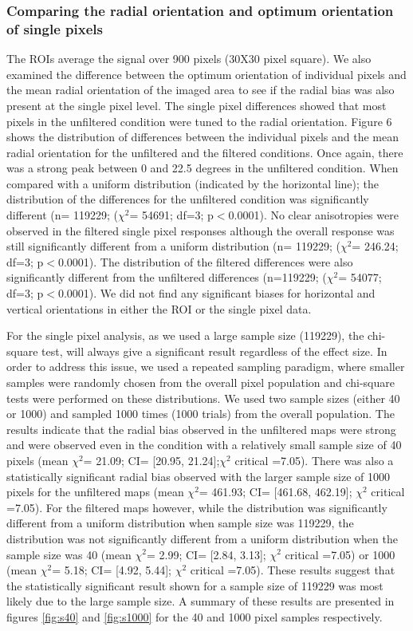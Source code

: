 		\subsubsection{Comparing the radial orientation and optimum orientation of single pixels}
		The ROIs average the signal over 900 pixels (30X30 pixel square). We also examined the difference between the optimum orientation of individual pixels and the mean radial orientation of the imaged area to see if the radial bias was also present at the single pixel level. The single pixel differences showed that most pixels in the unfiltered condition were tuned to the radial orientation. Figure 6 shows the distribution of differences between the individual pixels and the mean radial orientation for the unfiltered and the filtered conditions. Once again, there was a strong peak between 0 and 22.5 degrees in the unfiltered condition. When compared with a uniform distribution (indicated by the horizontal line); the distribution of the differences for the unfiltered condition was significantly different (n= 119229; ($\chi^2$= 54691; df=3; p$<$0.0001). No clear anisotropies were observed in the filtered single pixel responses although the overall response was still significantly different from a uniform distribution (n= 119229; ($\chi^2$= 246.24; df=3; p$<$0.0001). The distribution of the filtered differences were also significantly different from the unfiltered differences (n=119229; ($\chi^2$= 54077; df=3; p$<$0.0001). We did not find any significant biases for horizontal and vertical orientations in either the ROI or the single pixel data.	
			
		For the single pixel analysis, as we used a large sample size (119229), the chi-square test, will always give a significant result regardless of the effect size. In order to address this issue, we used a repeated sampling paradigm, where smaller samples were randomly chosen from the overall pixel population and chi-square tests were performed on these distributions. We used two sample sizes (either 40 or 1000) and sampled 1000 times (1000 trials) from the overall population. The results indicate that the radial bias observed in the unfiltered maps were strong and were observed even in the condition with a relatively small sample size of 40 pixels (mean $\chi^2$= 21.09; CI= [20.95, 21.24];$\chi^2$ critical =7.05). There was also a statistically significant radial bias observed with the larger sample size of 1000 pixels for the unfiltered maps (mean $\chi^2$= 461.93; CI= [461.68, 462.19]; $\chi^2$ critical =7.05). For the filtered maps however, while the distribution was significantly different from a uniform distribution when sample size was 119229, the distribution was not significantly different from a uniform distribution when the sample size was 40 (mean $\chi^2$= 2.99; CI= [2.84, 3.13]; $\chi^2$ critical =7.05) or 1000 (mean $\chi^2$= 5.18; CI= [4.92, 5.44]; $\chi^2$ critical =7.05). These results suggest that the statistically significant result shown for a sample size of 119229 was most likely due to the large sample size. A summary of these results are presented in figures \ref{fig:s40} and \ref{fig:s1000} for the 40 and 1000 pixel samples respectively.
			
